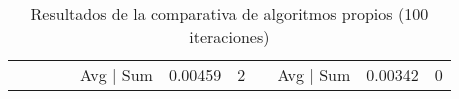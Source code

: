 \begin{sidewaystable}
\begin{tabular}{lllllllllll}
		&                           &                            &                              & Avg | Sum                              & 0.00459                      & 2                            &                              & Avg | Sum                             & 0.00342                      & 0                           
	\end{tabular}
	\caption{Resultados de la comparativa de algoritmos propios (100 iteraciones)}
\end{sidewaystable}